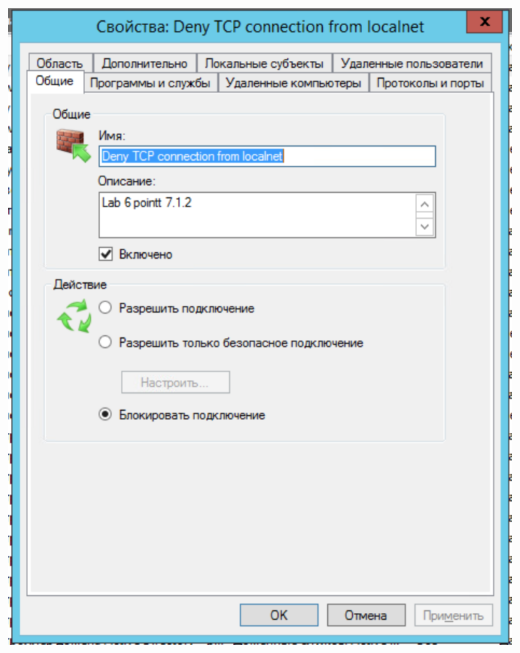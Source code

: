 \documentclass[a4paper,14pt]{extarticle}
\begin{document}
    \begin{center}
        \includegraphics[scale=0.7]{7.2.1.png}
    \end{center}
\end{document}
